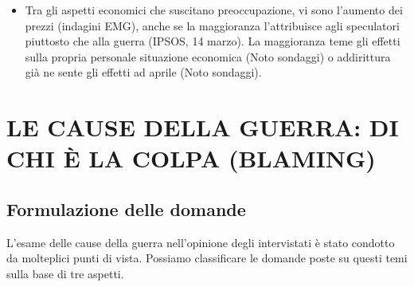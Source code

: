 \documentclass[
]{book}
\providecommand{\tightlist}{%
  \setlength{\itemsep}{0pt}\setlength{\parskip}{0pt}}
\begin{document}
\begin{itemize}
\tightlist
\item
  Tra gli aspetti economici che suscitano preoccupazione, vi sono l'aumento dei prezzi (indagini EMG), anche se la maggioranza l'attribuisce agli speculatori piuttosto che alla guerra (IPSOS, 14 marzo). La maggioranza teme gli effetti sulla propria personale situazione economica (Noto sondaggi) o addirittura già ne sente gli effetti ad aprile (Noto sondaggi).
\end{itemize}

\hypertarget{le-cause-della-guerra-di-chi-uxe8-la-colpa-blaming}{%
\chapter{LE CAUSE DELLA GUERRA: DI CHI È LA COLPA (BLAMING)}\label{le-cause-della-guerra-di-chi-uxe8-la-colpa-blaming}}

\hypertarget{formulazione-delle-domande-1}{%
\section{Formulazione delle domande}\label{formulazione-delle-domande-1}}

L'esame delle cause della guerra nell'opinione degli intervistati è stato condotto da molteplici punti di vista. Possiamo classificare le domande poste su questi temi sulla base di tre aspetti.
\end{document}
